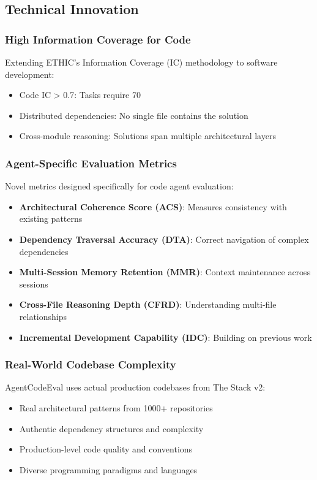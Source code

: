 \documentclass{article}
\begin{document}
\subsection{Technical Innovation}

\subsubsection{High Information Coverage for Code}
Extending ETHIC's Information Coverage (IC) methodology to software development:
\begin{itemize}
    \item Code IC > 0.7: Tasks require 70%
    \item Distributed dependencies: No single file contains the solution
    \item Cross-module reasoning: Solutions span multiple architectural layers
\end{itemize}

\subsubsection{Agent-Specific Evaluation Metrics}
Novel metrics designed specifically for code agent evaluation:
\begin{itemize}
    \item \textbf{Architectural Coherence Score (ACS)}: Measures consistency with existing patterns
    \item \textbf{Dependency Traversal Accuracy (DTA)}: Correct navigation of complex dependencies
    \item \textbf{Multi-Session Memory Retention (MMR)}: Context maintenance across sessions
    \item \textbf{Cross-File Reasoning Depth (CFRD)}: Understanding multi-file relationships
    \item \textbf{Incremental Development Capability (IDC)}: Building on previous work
\end{itemize}

\subsubsection{Real-World Codebase Complexity}
AgentCodeEval uses actual production codebases from The Stack v2:
\begin{itemize}
    \item Real architectural patterns from 1000+ repositories
    \item Authentic dependency structures and complexity
    \item Production-level code quality and conventions
    \item Diverse programming paradigms and languages
\end{itemize}
\end{document}
